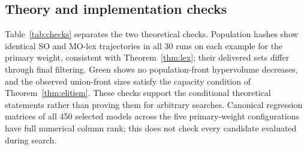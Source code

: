 \subsection{Theory and implementation checks}

Table~\ref{tab:checks} separates the two theoretical checks. Population hashes show identical SO and MO-lex trajectories in all 30 runs on each example for the primary weight, consistent with Theorem~\ref{thm:lex}; their delivered sets differ through final filtering. Green shows no population-front hypervolume decreases, and the observed union-front sizes satisfy the capacity condition of Theorem~\ref{thm:elitism}. These checks support the conditional theoretical statements rather than proving them for arbitrary searches. Canonical regression matrices of all 450 selected models across the five primary-weight configurations have full numerical column rank; this does not check every candidate evaluated during search.
\FloatBarrier

